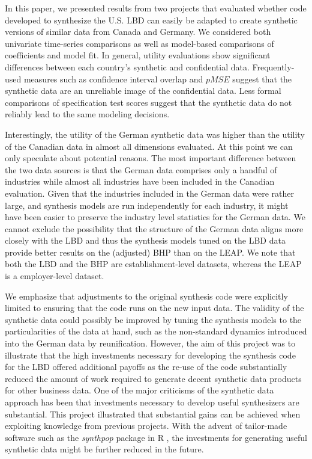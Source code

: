 
In this paper, we presented results from two projects that evaluated whether code developed to synthesize the U.S. LBD can easily be adapted to create synthetic versions of similar data from Canada and Germany. We considered both univariate time-series comparisons as well as model-based comparisons of coefficients and model fit. In general, utility evaluations show significant differences between each country's synthetic and confidential data. Frequently-used measures such as confidence interval overlap and $pMSE$ suggest that the synthetic data are an unreliable image of the confidential data. Less formal comparisons of specification test scores suggest that the synthetic data do not reliably lead to  the same modeling decisions.

Interestingly, the utility of the German synthetic data was higher than the utility of the Canadian data in almost all dimensions evaluated. At this point we can only speculate about potential reasons. The most important difference between the two data sources is that the German data comprises only a handful of industries while almost all industries have been included in the Canadian evaluation. Given that the industries included in the German data were rather large, and synthesis models are run independently for each industry, it might have been easier to preserve the industry level statistics for the German data. We cannot exclude the possibility that  the structure of the German data aligns more closely with the LBD and thus the synthesis models tuned on the LBD data provide better results on the (adjusted) BHP than on the LEAP. We note that both the LBD and the BHP are establishment-level datasets, whereas the LEAP is a employer-level dataset. 

We emphasize that adjustments to the original synthesis code were explicitly limited to ensuring that the code runs on the new input data. The validity of the synthetic data could possibly be improved by tuning the synthesis models to the particularities of the data at hand, such as the non-standard dynamics introduced into the German data by reunification.  However, the aim of this project was to illustrate that the high investments necessary for developing the synthesis code for the LBD offered additional payoffs as the re-use of the code substantially reduced the amount of work required to generate decent synthetic data products for other business data. One of the major criticisms of the synthetic data approach has been  that investments necessary to develop useful synthesizers are substantial. This project illustrated that substantial gains can be achieved when exploiting knowledge from previous projects. With the advent of tailor-made software such as the \textit{synthpop} package in R \citep{JSSv074i11}, the investments for generating useful synthetic data might be further reduced in the future.

